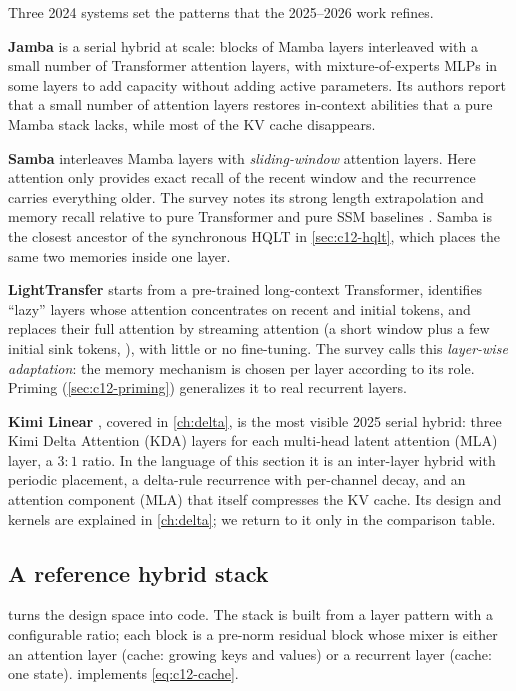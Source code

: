 Three 2024 systems set the patterns that the 2025--2026 work refines.

\textbf{Jamba} \citep{lieber2024jamba,jamba2024jamba15} is a serial hybrid at scale: blocks of
Mamba layers interleaved with a small number of Transformer attention layers, with
mixture-of-experts MLPs in some layers to add capacity without adding active parameters. Its
authors report that a small number of attention layers restores in-context abilities that a pure
Mamba stack lacks, while most of the KV cache disappears.

\textbf{Samba} \citep{ren2024samba} interleaves Mamba layers with \emph{sliding-window}
attention layers. Here attention only provides exact recall of the recent window and the
recurrence carries everything older. The survey notes its strong length extrapolation and
memory recall relative to pure Transformer and pure SSM baselines \citep{zhoubian2026memory}.
Samba is the closest ancestor of the synchronous HQLT in \cref{sec:c12-hqlt}, which places the
same two memories inside one layer.

\textbf{LightTransfer} \citep{zhang2024lighttransfer} starts from a pre-trained long-context
Transformer, identifies ``lazy'' layers whose attention concentrates on recent and initial
tokens, and replaces their full attention by streaming attention (a short window plus a few
initial sink tokens, \citealp{xiao2023streamingllm}), with little or no fine-tuning. The survey
calls this \emph{layer-wise adaptation}: the memory mechanism is chosen per layer according to
its role. Priming (\cref{sec:c12-priming}) generalizes it to real recurrent layers.

\textbf{Kimi Linear} \citep{kimi2025linear}, covered in \cref{ch:delta}, is the most visible
2025 serial hybrid: three Kimi Delta Attention (KDA) layers for each multi-head latent
attention (MLA) layer, a $3{:}1$ ratio. In the language of this section it is an inter-layer
hybrid with periodic placement, a delta-rule recurrence with per-channel decay, and an attention
component (MLA) that itself compresses the KV cache. Its design and kernels are explained in
\cref{ch:delta}; we return to it only in the comparison table.

\subsection{A reference hybrid stack}\label{sec:c12-ref-stack}

 turns the design space into code. The stack is built from a layer pattern
with a configurable ratio; each block is a pre-norm residual block whose mixer is either an
attention layer (cache: growing keys and values) or a recurrent layer (cache: one state).
 implements \eqref{eq:c12-cache}.

